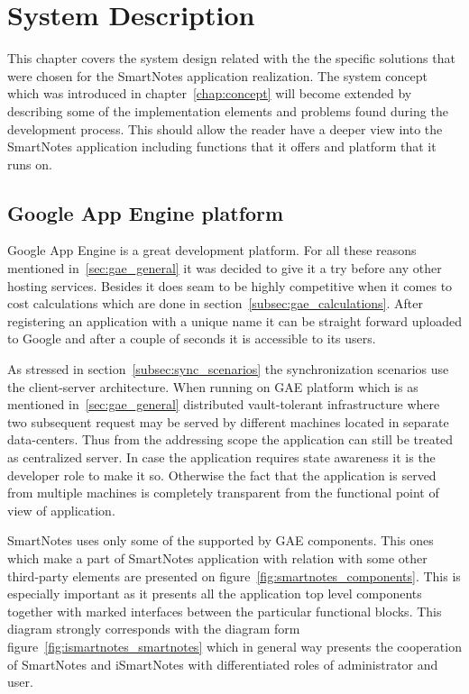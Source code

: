 \chapter{System Description}\label{chap:sys_description}
This chapter covers the system design related with the the specific solutions that were chosen for the SmartNotes application realization. The system concept which was introduced in chapter~\ref{chap:concept} will become extended by describing some of the implementation elements and problems found during the development process. This should allow the reader have a deeper view into the SmartNotes application including functions that it offers and platform that it runs on.
\section{Google App Engine platform}\label{sec:gae}
Google App Engine is a great development platform. For all these reasons mentioned in~\ref{sec:gae_general} it was decided to give it a try before any other hosting services. Besides it does seam to be highly competitive when it comes to cost calculations which are done in section~\ref{subsec:gae_calculations}. After registering an application with a unique name it can be straight forward uploaded to Google and after a couple of seconds it is accessible to its users.

As stressed in section~\ref{subsec:sync_scenarios} the synchronization scenarios use the client-server architecture. When running on GAE platform which is as mentioned in~\ref{sec:gae_general} distributed vault-tolerant infrastructure where two subsequent request may be served by different machines located in separate data-centers. Thus from the addressing scope the application can still be treated as centralized server. In case the application requires state awareness it is the developer role to make it so. Otherwise the fact that the application is served from multiple machines is completely transparent from the functional point of view of application. 

SmartNotes uses only some of the supported by GAE components. This ones which make a part of SmartNotes application with relation with some other third-party elements are presented on figure~\ref{fig:smartnotes_components}. This is especially important as it presents all the application top level components together with marked interfaces between the particular functional blocks. This diagram strongly corresponds with the diagram form figure~\ref{fig:ismartnotes_smartnotes} which in general way presents the cooperation of SmartNotes and iSmartNotes with differentiated roles of administrator and user. 

